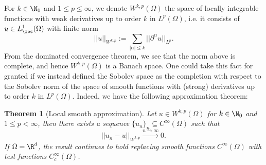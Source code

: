 \documentclass[reqno]{amsart}
\newtheorem{theorem}{Theorem}
\theoremstyle{definition}
\theoremstyle{remark}
\begin{document}
For $k \in \N_0$ and $1 \leq p \leq \infty$, we denote $W^{k, p} (\Omega)$ the space of locally integrable functions with weak derivatives up to order $k$ in $L^p (\Omega)$, i.e. it consists of $u \in L^1_\loc (\Omega)$ with finite norm
	\[ ||u||_{W^{k, p}} := \sum_{|\alpha| \leq k} || \partial^\alpha u ||_{L^p}. \]
From the dominated convergence theorem, we see that the norm above is complete, and hence $W^{k, p} (\Omega)$ is a Banach space. One could take this fact for granted if we instead defined the Sobolev space as the completion with respect to the Sobolev norm of the space of smooth functions with (strong) derivatives up to order $k$ in $L^p (\Omega)$. Indeed, we have the following approximation theorem:

\begin{theorem}[Local smooth approximation]
	Let $u \in W^{k, p} (\Omega)$ for $k \in \N_0$ and $1 \leq p < \infty$, then there exists a sequence $\{u_n\}_n \subseteq C^\infty (\Omega)$ such that 
		\[ ||u_n - u||_{W^{k, p}} \overset{n \to \infty}{\longrightarrow} 0. \]
	If $\Omega = \R^d$, the result continues to hold replacing smooth functions $C^\infty (\Omega)$ with test functions $C^\infty_c (\Omega)$. 	
\end{theorem}
\end{document}
